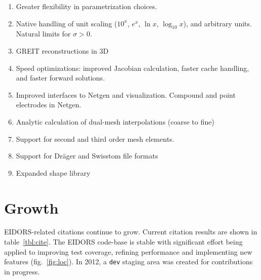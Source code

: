 \documentclass[10pt,a4paper]{article}
\begin{document}
\begin{multicols}{2}
\begin{enumerate}
\item Greater flexibility in parametrization choices.

\item Native handling of unit scaling ($10^x$, $e^x$, $\ln x$, $\log_{10} x$),
 and arbitrary units.
  Natural limits for $\sigma > 0$. %

\item GREIT reconstructions in 3D

\item Speed optimizations: improved Jacobian calculation, faster cache handling, and 
  faster forward solutions.


\item Improved interfaces to Netgen and visualization.
      Compound and point electrodes in Netgen.

\item Analytic calculation of dual-mesh interpolations (coarse to fine)

\item Support for second and third order mesh elements.

\item Support for Dr\"ager and Swisstom file formats

\item Expanded shape library
\end{enumerate}

\section{Growth}
EIDORS-related citations continue to grow. Current citation results are
shown in table~\ref{tbl:cite}.
%
The EIDORS code-base is stable with significant effort being applied to
improving test coverage, refining performance and implementing new features
(fig.~\ref{fig:loc}). In 2012, a {\tt dev} staging area was created for
contributions in progress.


\end{multicols}
\end{document}
